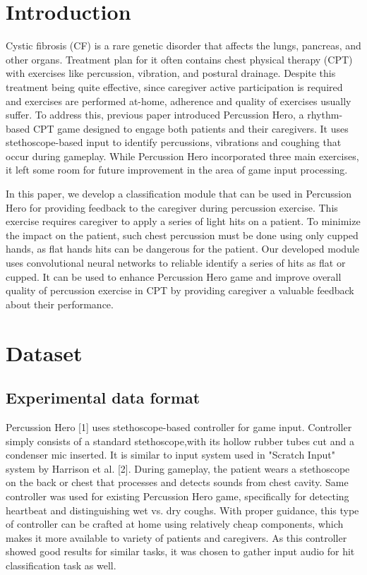 \documentclass[conference]{IEEEtran}
\begin{document}
\section{Introduction}

Cystic fibrosis (CF) is a rare genetic disorder that affects the lungs, pancreas, and other organs. Treatment plan for it often contains chest physical therapy (CPT) with exercises like percussion, vibration, and postural drainage. Despite this treatment being quite effective, since caregiver active participation is required and exercises are performed at-home, adherence and quality of exercises usually suffer. To address this, previous paper introduced Percussion Hero, a rhythm-based CPT game designed to engage both patients and their caregivers. It uses stethoscope-based input to identify percussions, vibrations and coughing that occur during gameplay. While Percussion Hero incorporated three main exercises, it left some room for future improvement in the area of game input processing. 

In this paper, we develop a classification module that can be used in Percussion Hero for providing feedback to the caregiver during percussion exercise. This exercise requires caregiver to apply a series of light hits on a patient. To minimize the impact on the patient, such chest percussion must be done using only cupped hands, as flat hands hits can be dangerous for the patient. Our developed module uses convolutional neural networks to reliable identify a series of hits as flat or cupped. It can be used to enhance Percussion Hero game and improve overall quality of percussion exercise in CPT by providing caregiver a valuable feedback about their performance. 

\section{Dataset}

\subsection{Experimental data format}
Percussion Hero [1] uses stethoscope-based controller for game input. Controller simply consists of a standard stethoscope,with its hollow rubber tubes cut and a condenser mic inserted. It is similar to input system used in "Scratch Input" system by Harrison et al. [2]. During gameplay, the patient wears a stethoscope on the back or chest that processes and detects sounds from chest cavity. Same controller was used for existing Percussion Hero game, specifically for detecting heartbeat and distinguishing wet vs. dry coughs. With proper guidance, this type of controller can be crafted at home using relatively cheap components, which makes it more available to variety of patients and caregivers. As this controller showed good results for similar tasks, it was chosen to gather input audio for hit classification task as well. 
\end{document}
